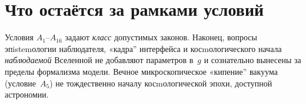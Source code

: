 \section{Что остаётся за рамками условий}

Условия $A_1$--$A_{16}$ задают \emph{класс} допустимых законов.
Наконец, вопросы эпistemологии наблюдателя, «кадра'' интерфейса и косmологического
начала \emph{наблюдаемой} Вселенной не добавляют параметров в~$g$
и сознательно вынесены за пределы формализма модели.
Вечное микроскопическое «кипение'' вакуума (условие~$A_5$) не тождественно
началу косmологической эпохи, доступной астрономии.

